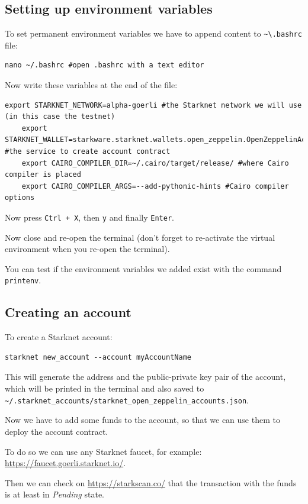 \documentclass[12pt]{article}
\begin{document}
\subsection{Setting up environment variables}
To set permanent environment variables we have to append content to \verb|~\.bashrc| file:
\begin{lstlisting}[language=terminal]
    nano ~/.bashrc #open .bashrc with a text editor
\end{lstlisting}

Now write these variables at the end of the file:
\begin{lstlisting}[language=terminal]
    export STARKNET_NETWORK=alpha-goerli #the Starknet network we will use (in this case the testnet)
    export STARKNET_WALLET=starkware.starknet.wallets.open_zeppelin.OpenZeppelinAccount #the service to create account contract
    export CAIRO_COMPILER_DIR=~/.cairo/target/release/ #where Cairo compiler is placed
    export CAIRO_COMPILER_ARGS=--add-pythonic-hints #Cairo compiler options
\end{lstlisting}

Now press \verb|Ctrl + X|, then \verb|y| and finally \verb|Enter|.

Now close and re-open the terminal (don't forget to re-activate the virtual environment when you re-open the terminal).

You can test if the environment variables we added exist with the command \verb|printenv|.

\subsection{Creating an account}
To create a Starknet account:
\begin{lstlisting}[language=terminal]
    starknet new_account --account myAccountName
\end{lstlisting}

This will generate the address and the public-private key pair of the account, which will be printed in the terminal and also saved to\\\verb|~/.starknet_accounts/starknet_open_zeppelin_accounts.json|.

Now we have to add some funds to the account, so that we can use them to deploy the account contract.

To do so we can use any Starknet faucet, for example: \url{https://faucet.goerli.starknet.io/}.

Then we can check on \url{https://starkscan.co/} that the transaction with the funds is at least in \emph{Pending} state.
\end{document}
